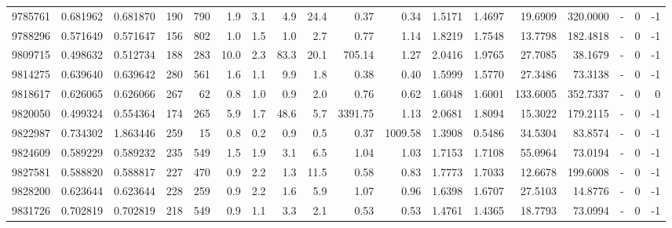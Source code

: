 \begin{tabular}{rrrrrrrrrrrrrrrlrr}
   9785761 & 0.681962 &   0.681870 &  190 &  790 &      1.9 &      3.1 &     4.9 &     24.4 &       0.37 &        0.34 &  1.5171 &  1.4697 &   19.6909 &  320.0000 &             - &        0 &         -1 \\
   9788296 & 0.571649 &   0.571647 &  156 &  802 &      1.0 &      1.5 &     1.0 &      2.7 &       0.77 &        1.14 &  1.8219 &  1.7548 &   13.7798 &  182.4818 &             - &        0 &         -1 \\
   9809715 & 0.498632 &   0.512734 &  188 &  283 &     10.0 &      2.3 &    83.3 &     20.1 &     705.14 &        1.27 &  2.0416 &  1.9765 &   27.7085 &   38.1679 &             - &        0 &         -1 \\
   9814275 & 0.639640 &   0.639642 &  280 &  561 &      1.6 &      1.1 &     9.9 &      1.8 &       0.38 &        0.40 &  1.5999 &  1.5770 &   27.3486 &   73.3138 &             - &        0 &         -1 \\
   9818617 & 0.626065 &   0.626066 &  267 &   62 &      0.8 &      1.0 &     0.9 &      2.0 &       0.76 &        0.62 &  1.6048 &  1.6001 &  133.6005 &  352.7337 &             - &        0 &          0 \\
   9820050 & 0.499324 &   0.554364 &  174 &  265 &      5.9 &      1.7 &    48.6 &      5.7 &    3391.75 &        1.13 &  2.0681 &  1.8094 &   15.3022 &  179.2115 &             - &        0 &         -1 \\
   9822987 & 0.734302 &   1.863446 &  259 &   15 &      0.8 &      0.2 &     0.9 &      0.5 &       0.37 &     1009.58 &  1.3908 &  0.5486 &   34.5304 &   83.8574 &             - &        0 &         -1 \\
   9824609 & 0.589229 &   0.589232 &  235 &  549 &      1.5 &      1.9 &     3.1 &      6.5 &       1.04 &        1.03 &  1.7153 &  1.7108 &   55.0964 &   73.0194 &             - &        0 &         -1 \\
   9827581 & 0.588820 &   0.588817 &  227 &  470 &      0.9 &      2.2 &     1.3 &     11.5 &       0.58 &        0.83 &  1.7773 &  1.7033 &   12.6678 &  199.6008 &             - &        0 &         -1 \\
   9828200 & 0.623644 &   0.623644 &  228 &  259 &      0.9 &      2.2 &     1.6 &      5.9 &       1.07 &        0.96 &  1.6398 &  1.6707 &   27.5103 &   14.8776 &             - &        0 &         -1 \\
   9831726 & 0.702819 &   0.702819 &  218 &  549 &      0.9 &      1.1 &     3.3 &      2.1 &       0.53 &        0.53 &  1.4761 &  1.4365 &   18.7793 &   73.0994 &             - &        0 &         -1 \\

\end{tabular}
